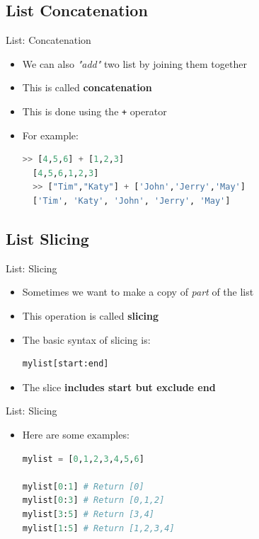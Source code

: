 \documentclass[10pt,xcolor={table,dvipsnames},t]{beamer}
\begin{document}
\subsection{List Concatenation}
\begin{frame}[fragile]{List: Concatenation}
  \begin{itemize}
    \item We can also \textit{"add"} two list by joining them together
    \item This is called \textbf{concatenation}
    \item This is done using the \texttt{+} operator
    \item For example:
\begin{lstlisting}[language=python]
  >> [4,5,6] + [1,2,3]
  [4,5,6,1,2,3]
  >> ["Tim","Katy"] + ['John','Jerry','May']
  ['Tim', 'Katy', 'John', 'Jerry', 'May']
\end{lstlisting}
  \end{itemize}
\end{frame}

\subsection{List Slicing}
\begin{frame}[fragile]{List: Slicing}
  \begin{itemize}
    \item Sometimes we want to make a copy of \textit{part} of the list
    \item This operation is called \textbf{slicing}
    \item The basic syntax of slicing is:
\begin{lstlisting}[language=python]
  mylist[start:end]
\end{lstlisting}
    \item The slice \textbf{includes start but exclude end}
  \end{itemize}
\end{frame}

\begin{frame}[fragile]{List: Slicing}
  \begin{itemize}
    \item Here are some examples:
    \begin{lstlisting}[language=python]
mylist = [0,1,2,3,4,5,6]

mylist[0:1] # Return [0]
mylist[0:3] # Return [0,1,2]
mylist[3:5] # Return [3,4]
mylist[1:5] # Return [1,2,3,4]
\end{lstlisting}
  \end{itemize}
\end{frame}
\end{document}
